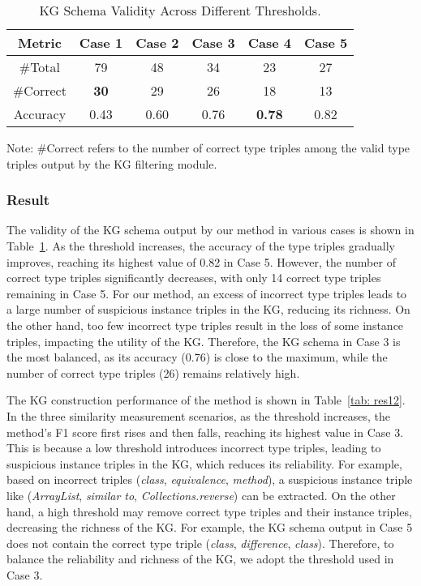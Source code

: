 \begin{table}[t]
\centering
\caption{KG Schema Validity Across Different Thresholds.}
\label{tab: res11}
\begin{tabular}{c|c|c|c|c|c}
\hline
Metric & Case 1 & Case 2 & Case 3 & Case 4 & Case 5 \\ \hline
\#Total      & 79              & 48              & 34              & 23               & 27              \\ \hline
\#Correct    & \textbf{30}              & 29              & 26              & 18               & 13              \\ \hline
Accuracy        & 0.43            & 0.60            & 0.76            & \textbf{0.78}            & 0.82           \\ \hline
\end{tabular}
\begin{tablenotes}
\small
\item Note: \#Correct refers to the number of correct type triples among the valid type triples output by the KG filtering module.
\end{tablenotes}
\vspace{-4mm}
\end{table}


\subsubsection{Result}
The validity of the KG schema output by our method in various cases is shown in Table~\ref{tab: res11}.
As the threshold increases, the accuracy of the type triples gradually improves, reaching its highest value of 0.82 in Case 5.
However, the number of correct type triples significantly decreases, with only 14 correct type triples remaining in Case 5.
For our method, an excess of incorrect type triples leads to a large number of suspicious instance triples in the KG, reducing its richness.
On the other hand, too few incorrect type triples result in the loss of some instance triples, impacting the utility of the KG.
Therefore, the KG schema in Case 3 is the most balanced, as its accuracy (0.76) is close to the maximum, while the number of correct type triples (26) remains relatively high.

The KG construction performance of the method is shown in Table~\ref{tab: res12}.
In the three similarity measurement scenarios, as the threshold increases, the method's F1 score first rises and then falls, reaching its highest value in Case 3.
This is because a low threshold introduces incorrect type triples, leading to suspicious instance triples in the KG, which reduces its reliability.
For example, based on incorrect triples (\textit{class}, \textit{equivalence}, \textit{method}), a suspicious instance triple like (\textit{ArrayList}, \textit{similar to}, \textit{Collections.reverse}) can be extracted. 
On the other hand, a high threshold may remove correct type triples and their instance triples, decreasing the richness of the KG.
For example, the KG schema output in Case 5 does not contain the correct type triple (\textit{class}, \textit{difference}, \textit{class}).
Therefore, to balance the reliability and richness of the KG, we adopt the threshold used in Case 3.

